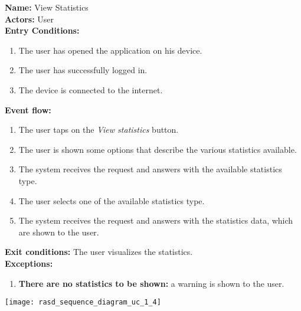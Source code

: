 \begin{usecase}{1.4}
    \textbf{Name: }View Statistics \\
    \textbf{Actors: } User \\
    \textbf{Entry Conditions:}
    \begin{enumerate}
        \item The user has opened the application on his device.
        \item The user has successfully logged in.
        \item The device is connected to the internet.
    \end{enumerate}
    \textbf{Event flow:}
    \begin{enumerate}
        \item The user taps on the \emph{View statistics} button.
        \item The user is shown some options that describe the various
        statistics available.
        \item The system receives the request and answers with the available
        statistics type.
        \item The user selects one of the available statistics type.
        \item The system receives the request and answers with the statistics
        data, which are shown to the user.
    \end{enumerate}
    \textbf{Exit conditions:} The user visualizes the statistics. \\
    \textbf{Exceptions:}
    \begin{enumerate}
        \item \textbf{There are no statistics to be shown:} a warning is shown
        to the user.
    \end{enumerate}
    \tcblower
    \centering
    \texttt{[image: rasd\_sequence\_diagram\_uc\_1\_4]}
\end{usecase}